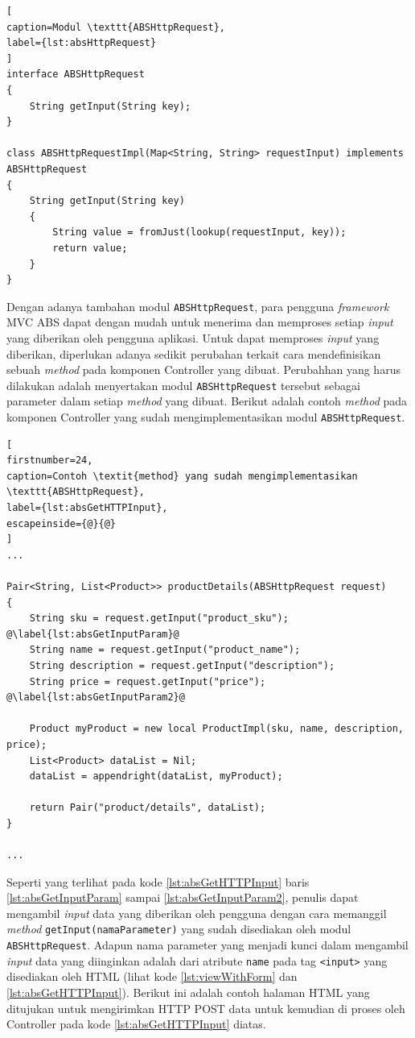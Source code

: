 \begin{lstlisting}[
caption=Modul \texttt{ABSHttpRequest},
label={lst:absHttpRequest}
]
interface ABSHttpRequest
{
	String getInput(String key);
}

class ABSHttpRequestImpl(Map<String, String> requestInput) implements ABSHttpRequest
{
	String getInput(String key)
	{
		String value = fromJust(lookup(requestInput, key));
		return value;
	}
}
\end{lstlisting}

Dengan adanya tambahan modul \texttt{ABSHttpRequest}, para pengguna \textit{framework} MVC ABS dapat dengan mudah untuk menerima dan memproses setiap \textit{input} yang diberikan oleh pengguna aplikasi. Untuk dapat memproses \textit{input} yang diberikan, diperlukan adanya sedikit perubahan terkait cara mendefinisikan sebuah \textit{method} pada komponen Controller yang dibuat. Perubahhan yang harus dilakukan adalah menyertakan modul \texttt{ABSHttpRequest} tersebut sebagai parameter dalam setiap \textit{method} yang dibuat. Berikut adalah contoh \textit{method} pada komponen Controller yang sudah mengimplementasikan modul \texttt{ABSHttpRequest}.

\begin{lstlisting}[
firstnumber=24,
caption=Contoh \textit{method} yang sudah mengimplementasikan \texttt{ABSHttpRequest},
label={lst:absGetHTTPInput},
escapeinside={@}{@}
]
...

Pair<String, List<Product>> productDetails(ABSHttpRequest request)
{
	String sku = request.getInput("product_sku"); @\label{lst:absGetInputParam}@
	String name = request.getInput("product_name");
	String description = request.getInput("description");
	String price = request.getInput("price"); @\label{lst:absGetInputParam2}@
	
	Product myProduct = new local ProductImpl(sku, name, description, price);
	List<Product> dataList = Nil;
	dataList = appendright(dataList, myProduct);
	
	return Pair("product/details", dataList);
}

...
\end{lstlisting}

Seperti yang terlihat pada kode \ref{lst:absGetHTTPInput} baris \ref{lst:absGetInputParam} sampai \ref{lst:absGetInputParam2}, penulis dapat mengambil \textit{input} data yang diberikan oleh pengguna dengan cara memanggil \textit{method} \texttt{getInput(namaParameter)} yang sudah disediakan oleh modul \texttt{ABSHttpRequest}. Adapun nama parameter yang menjadi kunci dalam mengambil \textit{input} data yang diinginkan adalah dari atribute \texttt{name} pada tag \texttt{<input>} yang disediakan oleh HTML (lihat kode \ref{lst:viewWithForm} dan \ref{lst:absGetHTTPInput}). Berikut ini adalah contoh halaman HTML yang ditujukan untuk mengirimkan HTTP POST data untuk kemudian di proses oleh Controller pada kode \ref{lst:absGetHTTPInput} diatas.

